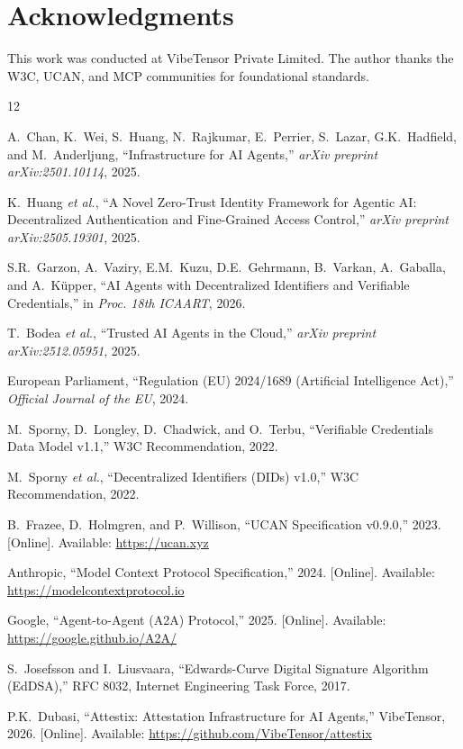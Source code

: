 \documentclass[conference]{IEEEtran}
\begin{document}
\section*{Acknowledgments}
This work was conducted at VibeTensor Private Limited. The author thanks the W3C, UCAN, and MCP communities for foundational standards.

\balance

\begin{thebibliography}{12}

A.~Chan, K.~Wei, S.~Huang, N.~Rajkumar, E.~Perrier, S.~Lazar, G.K.~Hadfield, and M.~Anderljung, ``Infrastructure for AI Agents,'' \textit{arXiv preprint arXiv:2501.10114}, 2025.

K.~Huang \textit{et al.}, ``A Novel Zero-Trust Identity Framework for Agentic AI: Decentralized Authentication and Fine-Grained Access Control,'' \textit{arXiv preprint arXiv:2505.19301}, 2025.

S.R.~Garzon, A.~Vaziry, E.M.~Kuzu, D.E.~Gehrmann, B.~Varkan, A.~Gaballa, and A.~K\"{u}pper, ``AI Agents with Decentralized Identifiers and Verifiable Credentials,'' in \textit{Proc. 18th ICAART}, 2026.

T.~Bodea \textit{et al.}, ``Trusted AI Agents in the Cloud,'' \textit{arXiv preprint arXiv:2512.05951}, 2025.

European Parliament, ``Regulation (EU) 2024/1689 (Artificial Intelligence Act),'' \textit{Official Journal of the EU}, 2024.

M.~Sporny, D.~Longley, D.~Chadwick, and O.~Terbu, ``Verifiable Credentials Data Model v1.1,'' W3C Recommendation, 2022.

M.~Sporny \textit{et al.}, ``Decentralized Identifiers (DIDs) v1.0,'' W3C Recommendation, 2022.

B.~Frazee, D.~Holmgren, and P.~Willison, ``UCAN Specification v0.9.0,'' 2023. [Online]. Available: \url{https://ucan.xyz}

Anthropic, ``Model Context Protocol Specification,'' 2024. [Online]. Available: \url{https://modelcontextprotocol.io}

Google, ``Agent-to-Agent (A2A) Protocol,'' 2025. [Online]. Available: \url{https://google.github.io/A2A/}

S.~Josefsson and I.~Liusvaara, ``Edwards-Curve Digital Signature Algorithm (EdDSA),'' RFC 8032, Internet Engineering Task Force, 2017.

P.K.~Dubasi, ``Attestix: Attestation Infrastructure for AI Agents,'' VibeTensor, 2026. [Online]. Available: \url{https://github.com/VibeTensor/attestix}

\end{thebibliography}
\end{document}
